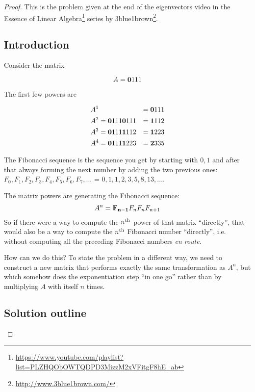 \begin{proof}
This is the problem given at the end of the eigenvectors video in the
Essence of Linear Algebra\footnote{\url{https://www.youtube.com/playlist?list=PLZHQObOWTQDPD3MizzM2xVFitgF8hE_ab}}
series by 3blue1brown\footnote{\url{http://www.3blue1brown.com/}}.


\subsection*{Introduction}

Consider the matrix

$$
A = \mathbf{0}{1}
        {1}{1}
$$

The first few powers are

\begin{align*}
&A^{1} &= \mathbf{0}{1}
              {1}{1}
\\
&A^{2} = \mathbf{0}{1}
             {1}{1} \mathbf{0}{1}
                        {1}{1} &= \mathbf{1}{1}
                                      {1}{2}
\\
&A^{3} = \mathbf{0}{1}
             {1}{1} \mathbf{1}{1}
                        {1}{2} &= \mathbf{1}{2}
                                      {2}{3}
\\
&A^{4} = \mathbf{0}{1}
             {1}{1} \mathbf{1}{2}
                        {2}{3} &= \mathbf{2}{3}
                                      {3}{5}
\end{align*}

The Fibonacci sequence is the sequence you get by starting with $0,
1$ and after that always forming the next number by adding the two previous ones:
$F_0, F_1, F_2, F_3, F_4, F_5, F_6, F_7, ...$ = $0, 1, 1, 2, 3, 5, 8, 13, ...$.

The matrix powers are generating the Fibonacci sequence:
\begin{align*}
  A^{n} = \mathbf{F_{n-1} }{F_n      }
  {F_n     }{F_{n+1} }
\end{align*}
So if there were a way to compute the $n^{\text{th}}$ power of that matrix ``directly'',
that would also be a way to compute the $n^{\text{th}}$ Fibonacci number ``directly'',
i.e. without computing all the preceding Fibonacci numbers \textit{en route}.

How can we do this? To state the problem in a different way, we need to
construct a new matrix that performs exactly the same transformation as $A^n$,
but which somehow does the exponentiation step ``in one go'' rather than by
multiplying $A$ with itself $n$ times.

\subsection*{Solution outline}


\end{proof}
